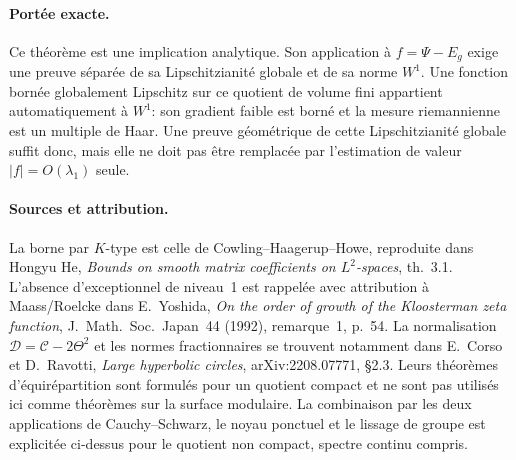 \paragraph{Portée exacte.}
Ce théorème est une implication analytique. Son application à
$f=\Psi-E_g$ exige une preuve séparée de sa Lipschitzianité globale
et de sa norme $W^1$. Une fonction bornée globalement Lipschitz sur
ce quotient de volume fini appartient automatiquement à $W^1$:
son gradient faible est borné et la mesure riemannienne est un
multiple de Haar. Une preuve géométrique de cette Lipschitzianité
globale suffit donc, mais elle ne doit pas être remplacée par
l'estimation de valeur $|f|=O(\lambda_1)$ seule.

\paragraph{Sources et attribution.}
La borne par $K$-type est celle de Cowling--Haagerup--Howe, reproduite
dans Hongyu He, \emph{Bounds on smooth matrix coefficients on
$L^2$-spaces}, th.~3.1. L'absence d'exceptionnel de niveau~1 est rappelée
avec attribution à Maass/Roelcke dans E.~Yoshida, \emph{On the order
of growth of the Kloosterman zeta function}, J.~Math.~Soc.~Japan~44
(1992), remarque~1, p.~54. La normalisation
$\mathcal D=\mathcal C-2\Theta^2$ et les normes fractionnaires se trouvent
notamment dans E.~Corso et D.~Ravotti, \emph{Large hyperbolic circles},
arXiv:2208.07771, \S2.3. Leurs théorèmes d'équirépartition sont formulés
pour un quotient compact et ne sont pas utilisés ici comme théorèmes
sur la surface modulaire. La combinaison par les deux applications de
Cauchy--Schwarz, le noyau ponctuel et le lissage de groupe est explicitée
ci-dessus pour le quotient non compact, spectre continu compris.
